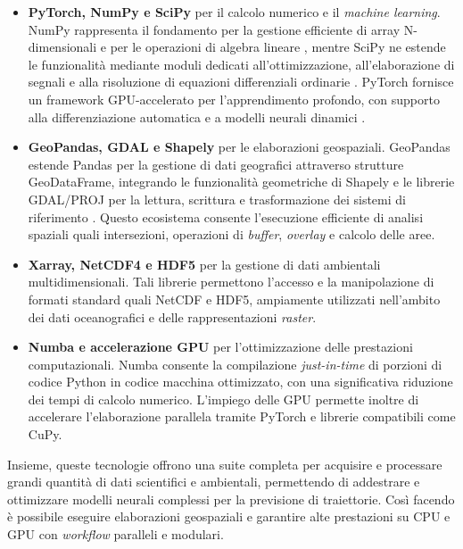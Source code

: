 \begin{itemize}
  \item \textbf{PyTorch, NumPy e SciPy} per il calcolo numerico e il \textit{machine
    learning}. NumPy rappresenta il fondamento per la gestione efficiente di
    array N-dimensionali e per le operazioni di algebra lineare
    \cite{walt2011numpy}, mentre SciPy ne estende le funzionalità mediante moduli
    dedicati all'ottimizzazione, all'elaborazione di segnali e alla risoluzione
    di equazioni differenziali ordinarie \cite{virtanen2020scipy}. PyTorch fornisce
    un framework GPU-accelerato per l'apprendimento profondo, con supporto alla
    differenziazione automatica e a modelli neurali dinamici
    \cite{paszke2019pytorch}.

  \item \textbf{GeoPandas, GDAL e Shapely} per le elaborazioni geospaziali. GeoPandas
    estende Pandas per la gestione di dati geografici attraverso strutture GeoDataFrame,
    integrando le funzionalità geometriche di Shapely e le librerie GDAL/PROJ
    per la lettura, scrittura e trasformazione dei sistemi di riferimento \cite{geopandas2025}.
    Questo ecosistema consente l'esecuzione efficiente di analisi spaziali quali
    intersezioni, operazioni di \textit{buffer}, \textit{overlay} e calcolo
    delle aree.

  \item \textbf{Xarray, NetCDF4 e HDF5} per la gestione di dati ambientali
    multidimensionali. Tali librerie permettono l'accesso e la manipolazione di formati
    standard quali NetCDF e HDF5, ampiamente utilizzati nell'ambito dei dati
    oceanografici e delle rappresentazioni \textit{raster}.

  \item \textbf{Numba e accelerazione GPU} per l'ottimizzazione delle
    prestazioni computazionali. Numba consente la compilazione \textit{just-in-time}
    di porzioni di codice Python in codice macchina ottimizzato, con una significativa
    riduzione dei tempi di calcolo numerico. L'impiego delle GPU permette
    inoltre di accelerare l'elaborazione parallela tramite PyTorch e librerie
    compatibili come CuPy.
\end{itemize}

\noindent
Insieme, queste tecnologie offrono una suite completa per acquisire e processare
grandi quantità di dati scientifici e ambientali, permettendo di addestrare e
ottimizzare modelli neurali complessi per la previsione di traiettorie. Così facendo
è possibile eseguire elaborazioni geospaziali e garantire alte prestazioni su CPU
e GPU con \textit{workflow} paralleli e modulari.

